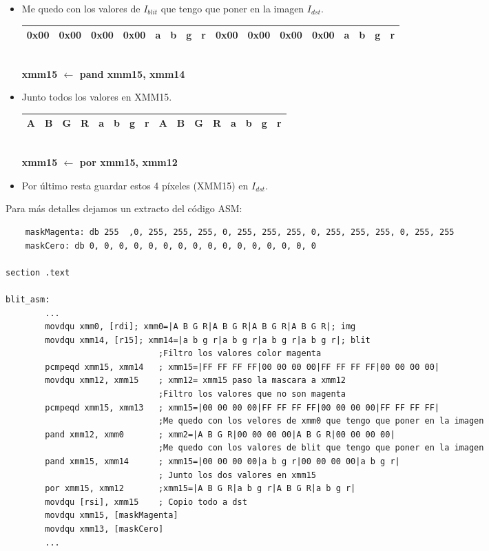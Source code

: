 \begin{itemize}
	\item Me quedo con los valores de $I_{blit}$ que tengo que poner en la imagen $I_{dst}$.
		\begin{center}
		   \begin{tabular}{| c | c | c | c || c | c | c | c || c | c | c | c || c | c | c | c |}
			 \hline
			 0x00 & 0x00 & 0x00 & 0x00 & a & b & g & r & 0x00 & 0x00 & 0x00 & 0x00 & a & b & g & r \\ \hline
		   \end{tabular}
		   \\ \textbf{xmm15 $\gets$ pand xmm15, xmm14}
		\end{center}		
	
	\item Junto todos los valores en XMM15.
		\begin{center}
		   \begin{tabular}{| c | c | c | c || c | c | c | c || c | c | c | c || c | c | c | c |}
			 \hline
			 A & B & G & R & a & b & g & r & A & B & G & R & a & b & g & r \\ \hline
		   \end{tabular}
		   \\ \textbf{xmm15 $\gets$ por xmm15, xmm12}
		\end{center}		
	\item Por último resta guardar estos 4 píxeles (XMM15) en $I_{dst}$.

\end{itemize}

Para más detalles dejamos un extracto del código ASM:

\begin{codesnippet}
\begin{verbatim}
	maskMagenta: db 255	 ,0, 255, 255, 255, 0, 255, 255, 255, 0, 255, 255, 255, 0, 255, 255
	maskCero: db 0, 0, 0, 0, 0, 0, 0, 0, 0, 0, 0, 0, 0, 0, 0, 0 

section .text

blit_asm:
		...
		movdqu xmm0, [rdi]; xmm0=|A B G R|A B G R|A B G R|A B G R|; img	
		movdqu xmm14, [r15]; xmm14=|a b g r|a b g r|a b g r|a b g r|; blit
							   ;Filtro los valores color magenta
		pcmpeqd xmm15, xmm14   ; xmm15=|FF FF FF FF|00 00 00 00|FF FF FF FF|00 00 00 00| 
		movdqu xmm12, xmm15	   ; xmm12= xmm15 paso la mascara a xmm12 
							   ;Filtro los valores que no son magenta
		pcmpeqd xmm15, xmm13   ; xmm15=|00 00 00 00|FF FF FF FF|00 00 00 00|FF FF FF FF|
							   ;Me quedo con los velores de xmm0 que tengo que poner en la imagen
		pand xmm12, xmm0       ; xmm2=|A B G R|00 00 00 00|A B G R|00 00 00 00|
							   ;Me quedo con los valores de blit que tengo que poner en la imagen
		pand xmm15, xmm14      ; xmm15=|00 00 00 00|a b g r|00 00 00 00|a b g r|
							   ; Junto los dos valores en xmm15
		por xmm15, xmm12 	   ;xmm15=|A B G R|a b g r|A B G R|a b g r|
		movdqu [rsi], xmm15	   ; Copio todo a dst
		movdqu xmm15, [maskMagenta]
		movdqu xmm13, [maskCero]
		...
\end{verbatim}
\end{codesnippet}